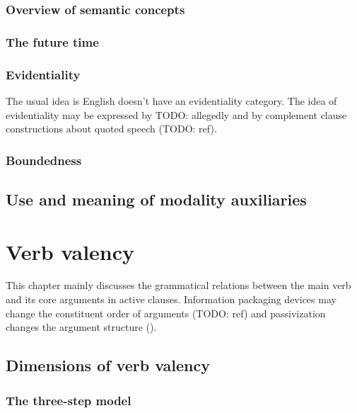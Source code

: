 \documentclass[UTF8, a4paper, oneside, scheme=plain]{ctexrep}
\begin{document}
\subsection{Overview of semantic concepts}

\subsection{The future time}\label{sec:future}

\subsection{Evidentiality}

The usual idea is English doesn't have an evidentiality category.
The idea of evidentiality may be expressed by TODO: allegedly 
and by complement clause constructions about quoted speech (TODO: ref).

\subsection{Boundedness}



\section{Use and meaning of modality auxiliaries}\label{sec:verb-inflection.modal-use}


\chapter{Verb valency}\label{chap:valency}

This chapter mainly discusses the grammatical relations between the main verb and its core arguments 
in active clauses.
Information packaging devices may change the constituent order of arguments (TODO: ref)
and passivization changes the argument structure (). 

\section{Dimensions of verb valency}\label{sec:valency.overview}

\subsection{The three-step model}\label{sec:valency.overview.steps}
\end{document}
